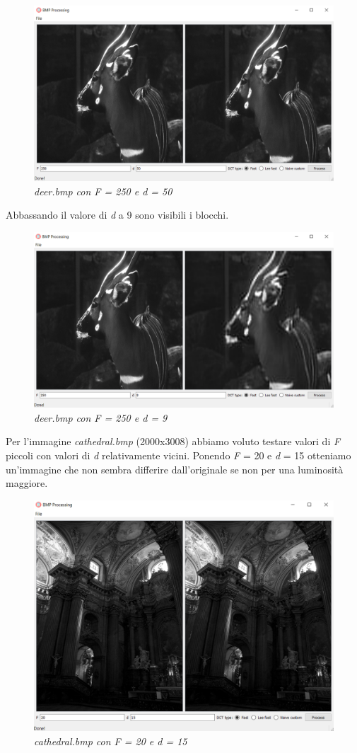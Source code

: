 \documentclass[a4paper,12pt]{report}
\begin{document}
\begin{figure}[H]
\centering
\includegraphics[width=0.8\linewidth]{../img/bambi_250_50.png}
\caption{\textit{deer.bmp con F = 250 e d = 50}}
\end{figure}

Abbassando il valore di \textit{d} a 9 sono visibili i blocchi.

\begin{figure}[H]
\centering
\includegraphics[width=0.8\linewidth]{../img/bambi_250_9.png}
\caption{\textit{deer.bmp con F = 250 e d = 9}}
\end{figure}

\newpage
Per l'immagine \textit{cathedral.bmp} (2000x3008) abbiamo voluto testare valori di \textit{F} piccoli con valori di \textit{d} relativamente vicini.
Ponendo \textit{F} = 20 e \textit{d} = 15 otteniamo un'immagine che non sembra differire dall'originale se non per una luminosità maggiore.

\begin{figure}[H]
\centering
\includegraphics[width=0.6\linewidth]{../img/cathedral_20_15.png}
\caption{\textit{cathedral.bmp con F = 20 e d = 15}}
\end{figure}
\end{document}
